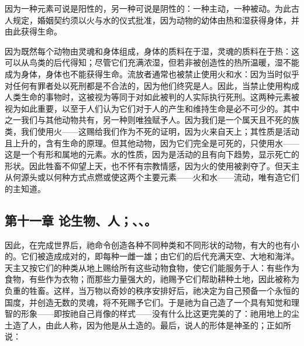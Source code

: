 \par

因为一种元素可说是阳性的，另一种可说是阴性的：一种主动，一种被动。为此古人规定，婚姻契约须以火与水的仪式批准，因为动物的幼体由热和湿获得身体，并由此获得生命。\par

因为既然每个动物由灵魂和身体组成，身体的质料在于湿，灵魂的质料在于热：这可以从鸟类的后代得知；尽管它们充满浓湿，但若非被创造性的热所温暖，湿不能成为身体，身体也不能获得生命。流放者通常也被禁止使用火和水：因为当时似乎对任何有罪者处以死刑都是不合法的，因为他们终究是人。因此，当禁止使用构成人类生命的事物时，这被视为等同于对如此被判的人实际执行死刑。这两种元素被视为如此重要，以至于人们认为它们对于人的产生和维持生命是必不可少的。其中之一我们与其他动物共有，另一种则唯独赋予人。因为我们是一个属天且不死的族类，我们使用火——这赐给我们作为不死的证明，因为火来自天上；其性质是活动且上升的，含有生命的原理。但其他动物，因为它们完全是可死的，只使用水——这是一个有形和属地的元素。水的性质，因为是活动的且有向下趋势，显示死亡的形状。因此牲畜不仰望上天，也不怀有宗教情感，因为火的使用被剥夺了。但天主从何源头或以何种方式点燃或使这两个主要元素——火和水——流动，唯有造它们的主知道。\par


\subsection{第十一章 论生物、人；、、。}

因此，在完成世界后，祂命令创造各种不同种类和不同形状的动物，有大的也有小的。它们被造成成对的，即每种一雌一雄；由它们的后代充满天空、大地和海洋。天主又按它们的种类从地上赐给所有这些动物食物，使它们能服务于人：有些作为食物，有些作为衣物；而那些力量强大的，祂赐予它们帮助耕种土地，因此被称为负重的牲畜。这样，当万物以奇妙的秩序安排好后，祂决定为自己预备一个永恒的国度，并创造无数的灵魂，将不死赐予它们。于是祂为自己造了一个具有知觉和理智的形象——即按祂自己肖像的样式——没有什么比这更完美的了：祂用地上的尘土造了人，由此人称，因为他是从土造的。最后，说人的形体是神圣的；正如所说：\par

\par

